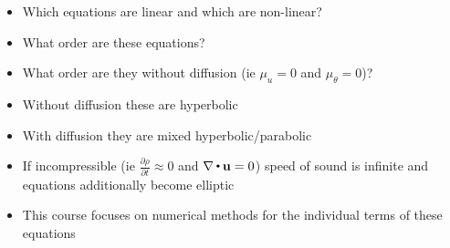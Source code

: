 \begin{itemize}
\item Which equations are linear and which are non-linear?
\item What order are these equations?
\item What order are they without diffusion (ie $\mu_u=0$ and $\mu_\theta=0$)?
\item Without diffusion these are hyperbolic
\item With diffusion they are mixed hyperbolic/parabolic
\item If incompressible (ie $\frac{\partial\rho}{\partial t}\approx 0$ and $\nabla\,{\scriptscriptstyle \stackrel{\bullet}{{}}}\,\mathbf u = 0$)
speed of sound is infinite and equations additionally become elliptic
\item This course focuses on numerical methods for the individual terms of these equations
\end{itemize}

